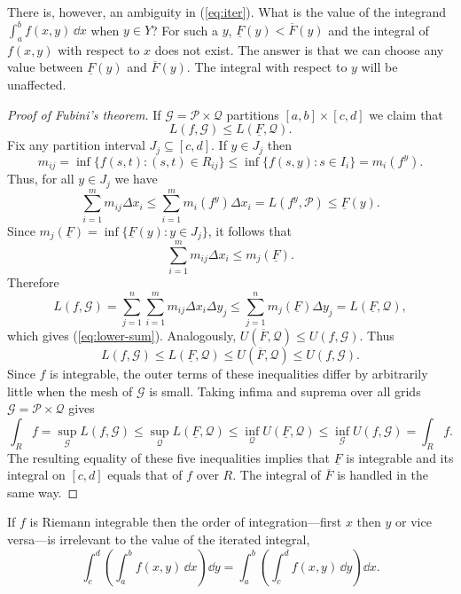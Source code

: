 \documentclass[11pt]{article}
\begin{document}
There is, however, an ambiguity in (\ref{eq:iter}).  What is the value of the integrand $\int_a^b f(x,y) \, \dd x$ when $y \in Y$?  For such a $y$, $\underline{F}(y) < \overline{F}(y)$ and the integral of $f(x,y)$ with respect to $x$ does not exist.  The answer is that we can choose any value between $\underline{F}(y)$ and $\overline{F}(y)$.  The integral with respect to $y$ will be unaffected.

\begin{proof}[Proof of Fubini's theorem]
  If $\mathcal{G} = \mathcal{P} \times \mathcal{Q}$ partitions $[a,b] \times [c,d]$ we claim that
  \begin{equation}
    \label{eq:lower-sum}
    L(f, \mathcal{G}) \leqslant L(\underline{F}, \mathcal{Q}).
  \end{equation}
  Fix any partition interval $J_j \subseteq [c,d]$.  If $y \in J_j$ then
  \[
    m_{ij} = \inf \{ f(s,t) \colon (s,t) \in R_{ij} \} 
    \leqslant \inf \{ f(s,y) \colon s \in I_i \} = m_i(f^y).
  \]
  Thus, for all $y \in J_j$ we have
  \[
    \sum_{i=1}^m m_{ij} \Delta x_i \leqslant \sum_{i=1}^m m_i(f^y) \Delta x_i = L(f^y, \mathcal{P}) \leqslant \underline{F}(y).
  \]
  Since $m_j(\underline{F}) = \inf \{ \underline{F}(y) \colon y \in J_j\}$, it follows that
  \[
    \sum_{i=1}^m m_{ij} \Delta x_i \leqslant m_j(\underline{F}).
  \]
  Therefore
  \[
    L(f,\mathcal{G}) = \sum_{j=1}^n \sum_{i=1}^m m_{ij} \Delta x_i \Delta y_j \leqslant \sum_{j=1}^n m_j(\underline{F}) \Delta y_j = L(\underline{F}, \mathcal{Q}),
  \]
  which gives (\ref{eq:lower-sum}).  Analogously, $U(\overline{F}, \mathcal{Q}) \leqslant U(f,\mathcal{G})$.  Thus
  \[
    L(f,\mathcal{G}) \leqslant L(\underline{F},\mathcal{Q}) \leqslant U(\overline{F},\mathcal{Q}) \leqslant U(f,\mathcal{G}).
  \]
  Since $f$ is integrable, the outer terms of these inequalities differ by arbitrarily little when the mesh of $\mathcal{G}$ is small.  Taking infima and suprema over all grids $\mathcal{G} = \mathcal{P} \times \mathcal{Q}$ gives
  \[
    \int_R f = \sup_{\mathcal{G}} L(f,\mathcal{G}) \leqslant \sup_{\mathcal{Q}} L(\underline{F}, \mathcal{Q}) \leqslant \inf_{\mathcal{Q}} U(\underline{F},\mathcal{Q}) \leqslant \inf_{\mathcal{G}} U(f,\mathcal{G}) = \int_R f.
  \]
  The resulting equality of these five inequalities implies that $\underline{F}$ is integrable and its integral on $[c,d]$ equals that of $f$ over $R$.  The integral of $\overline{F}$ is handled in the same way.
\end{proof}

\begin{cor}
  If $f$ is Riemann integrable then the order of integration---first $x$ then $y$ or vice versa---is irrelevant to the value of the iterated integral,
  \[
    \int_c^d \left( \int_a^b f(x,y) \, \dd x \right) \dd y
    = \int_a^b \left( \int_c^d f(x,y) \, \dd y \right) \dd x.
  \]
\end{cor}
\end{document}
